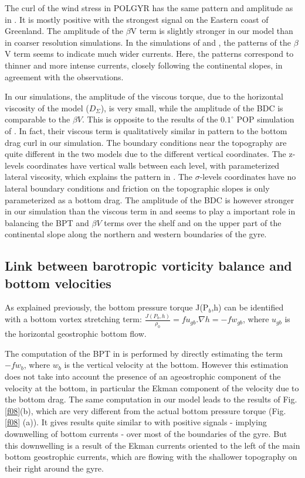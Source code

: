 \documentclass[os, manuscript]{copernicus}
\begin{document}
The curl of the wind stress in POLGYR has the same pattern and amplitude as in \citet{yeager2015}. It is mostly positive with the strongest signal on the Eastern coast of Greenland. The amplitude of the $\beta$V term is slightly stronger in our model than in coarser resolution simulations. In the simulations of \citet{hughes2001} and \citet{yeager2015}, the patterns of the $\beta$V term seems to indicate much wider currents. Here, the patterns correspond to thinner and more intense currents, closely following the continental slopes, in agreement with the observations.

In our simulations, the amplitude of the viscous torque, due to the horizontal viscosity of the model ($D_{\Sigma}$), is very small, while the amplitude of the BDC is comparable to the $\beta V$. This is opposite to the results of the $0.1^{\circ}$ POP simulation of \citet{yeager2015}. In fact, their viscous term is qualitatively similar in pattern to the bottom drag curl in our simulation. The boundary conditions near the topography are quite different in the two models due to the different vertical coordinates. The z-levels coordinates have vertical walls between each level, with parameterized lateral viscosity, which explains the pattern in \citet{yeager2015}. The $\sigma$-levels coordinates have no lateral boundary conditions and friction on the topographic slopes is only parameterized as a bottom drag. The amplitude of the BDC is however stronger in our simulation than the viscous term in \citet{yeager2015} and seems to play a important role in balancing the BPT and $\beta V$ terms over the shelf and on the upper part of the continental slope along the northern and western boundaries of the gyre.

\subsection{Link between barotropic vorticity balance and bottom velocities}

As explained previously, the bottom pressure torque J(P$_b$,h) can be identified with a bottom vortex stretching term: $\frac{J(P_b,h)}{\rho _0}=f u_{gb}.\nabla h = -f w_{gb}$, where $u_{gb}$ is the horizontal geostrophic bottom flow. 

The computation of the BPT in \citet{spence2012} is performed by directly estimating the term  $-f w_{b}$, where $w_{b}$ is the vertical velocity at the bottom. However this estimation does not take into account the presence of an ageostrophic component of the velocity at the bottom, in particular the Ekman component of the velocity due to the bottom drag. The same computation in our model leads to the results of Fig. \ref{f08}(b), which are very different from the actual bottom pressure torque (Fig. \ref{f08} (a)). It gives results quite similar to \citet{spence2012} with positive signals - implying downwelling of bottom currents - over most of the boundaries of the gyre. But this downwelling is a result of the Ekman currents oriented to the left of the main bottom geostrophic currents, which are flowing with the shallower topography on their right around the gyre.
\end{document}
